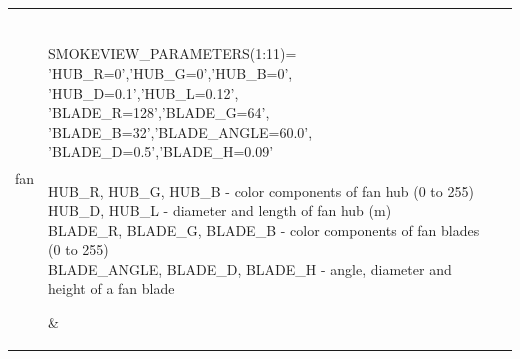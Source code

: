 \begin{longtable}[ht]{|l|l|c|}
{\ct fan} &
\parbox[c]{\boxwidth}{
\hspace{1in} \\
{\ct SMOKEVIEW\_PARAMETERS(1:11)=}\\
{\ct 'HUB\_R=0','HUB\_G=0','HUB\_B=0',}\\
{\ct 'HUB\_D=0.1','HUB\_L=0.12',}\\
{\ct 'BLADE\_R=128','BLADE\_G=64',}\\
{\ct 'BLADE\_B=32','BLADE\_ANGLE=60.0',}\\
{\ct 'BLADE\_D=0.5','BLADE\_H=0.09'}\\  \\
{\ct HUB\_R, HUB\_G, HUB\_B} - color components of fan hub (0 to 255) \\
{\ct HUB\_D, HUB\_L} - diameter and length of fan hub (m) \\
{\ct BLADE\_R, BLADE\_G, BLADE\_B} - color components of fan blades (0 to 255) \\
{\ct BLADE\_ANGLE, BLADE\_D, BLADE\_H} - angle, diameter and height of a fan blade \\
\hspace{1in}
} &
 \\ \hline

{\ct tsphere} &
\parbox[c]{\boxwidth}{
\hspace{1in} \\
    {\ct SMOKEVIEW\_PARAMETERS(1:9)=}\\
    {\ct 'R=255','G=255','B=255',}\\
    {\ct 'AX0=0.0','ELEV0=90.0',}\\
    {\ct 'ROT0=0.0','ROTATION\_RATE=10.0',}\\
    {\ct 'D=1.0',}\\
    {\ct 'tfile="t\%sphere\_cover\_04.png"'}\\ \\
{\ct R, G, B} - color components (0 to 255) \\
{\ct AX0, ELEV0, ROT0} - initial azimuth, elevation and rotation angle (deg) \\
{\ct ROTATION\_RATE} - rotation rate about z axis (deg/s) \\
{\ct D} - diameter (m) \\
{\ct tfile} - name of texture map file \\
\hspace{1in}
} &
 \\ \hline


\end{longtable}
